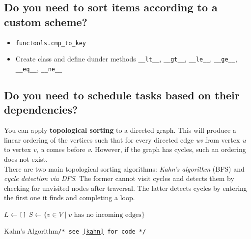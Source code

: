 \documentclass[12pt, titlepage]{article}
\begin{document}
\subsection{Do you need to sort items according to a custom scheme?}
\begin{itemize}
  \item \texttt{functools.cmp\_to\_key} 
  \item Create class and define dunder methods \texttt{\_\_lt\_\_}, \texttt{\_\_gt\_\_}, \texttt{\_\_le\_\_}, \texttt{\_\_ge\_\_}, \texttt{\_\_eq\_\_}, \texttt{\_\_ne\_\_}
\end{itemize}
\bigskip

\subsection{Do you need to schedule tasks based on their dependencies?}

You can apply \textbf{topological sorting} to a directed graph. This will produce a linear ordering of the vertices such that for every directed edge \textit{uv} from vertex \textit{u} to vertex \textit{v}, \textit{u} comes before \textit{v}. However, if the graph has cycles, such an ordering does not exist.\medskip\\

There are two main topological sorting algorithms: \textit{Kahn's algorithm} (BFS) and \textit{cycle detection via DFS}. The former cannot visit cycles and detects them by checking for unvisited nodes after traversal. The latter detects cycles by entering the first one it finds and completing a loop.\\

\begin{algorithm}[H]
  \SetAlgoLined
  \DontPrintSemicolon
  $L \longleftarrow$\hspace{0.5mm}\texttt{[]}\;
  $S \longleftarrow \{v \in V \mid v \text{ has no incoming edges}\}$\;
  \caption{Kahn's Algorithm\hspace{13mm}\texttt{/* see \ref{kahn} for code */}}
\end{algorithm}
\bigskip
\end{document}
